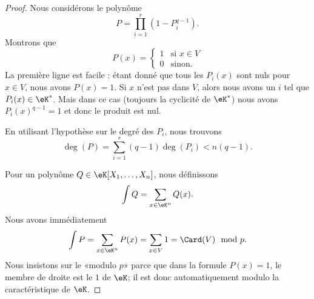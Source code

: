 \begin{proof}
	Nous considérons le polynôme
	\begin{equation}
		P=\prod_{i=1}^r(1-P_i^{q-1}).
	\end{equation}
	Montrons que
	\begin{equation}
		P(x)=\begin{cases}
			1 & \text{si } x\in V \\
			0 & \text{sinon}.
		\end{cases}
	\end{equation}
	La première ligne est facile : étant donné que tous les \( P_i(x)\) sont nuls pour \( x\in V\), nous avons \( P(x)=1\). Si \( x\) n'est pas dans \( V\), alors nous avons un \( i\) tel que \( P_i(x)\in \eK^*\). Mais dans ce cas (toujours la cyclicité de \( \eK^*\)) nous avons \( P_i(x)^{q-1}=1\) et donc le produit est nul.

	En utilisant l'hypothèse sur le degré des \( P_i\), nous trouvons
	\begin{equation}
		\deg(P)=\sum_{i=1}^r(q-1)\deg(P_i)<n(q-1).
	\end{equation}

	Pour un polynôme \( Q\in \eK[X_1,\ldots, X_n]\), nous définissons
	\begin{equation}
		\int Q=\sum_{x\in \eK^n}Q(x).
	\end{equation}
	Nous avons immédiatement
	\begin{equation}
		\int P=\sum_{x\in \eK^n}P(x)=\sum_{x\in V}1=\Card(V)\mod p.
	\end{equation}
	Nous insistons sur le «modulo \( p\)» parce que dans la formule \( P(x)=1\), le membre de droite est le \( 1\) de \( \eK\); il est donc automatiquement modulo la caractéristique de \( \eK\).


\end{proof}
